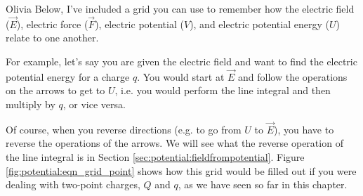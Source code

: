 \begin{studentOpinion}{Olivia}
Below, I've included a grid you can use to remember how the electric field ($\vec E$), electric force ($\vec F$), electric potential ($V$), and electric potential energy ($U$) relate to one another. 


For example, let's say you are given the electric field and want to find the electric potential energy for a charge $q$. You would start at $\vec E$ and follow the operations on the arrows to get to $U$, i.e. you would perform the line integral and then multiply by $q$, or vice versa.

Of course, when you reverse directions (e.g. to go from $U$ to $\vec E$), you have to reverse the operations of the arrows. We will see what the reverse operation of the line integral is in Section \ref{sec:potential:fieldfrompotential}. Figure \ref{fig:potential:eqn_grid_point} shows how this grid would be filled out if you were dealing with two-point charges, $Q$ and $q$, as we have seen so far in this chapter. 

\end{studentOpinion}
\vspace{-0.5cm}
